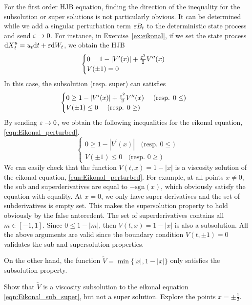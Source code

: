 \documentclass[11pt]{book}
\newcommand{\dt}{\text{\normalfont d}t}
\newcommand{\dX}{\text{\normalfont d}X}
\newcommand{\dW}{\text{\normalfont d}W}
\begin{document}
For the first order HJB equation, finding the direction of the inequality for the subsolution or super solutions is not particularly obvious. It can be determined while we add a singular perturbation term $\varepsilon B_t$ to the deterministic state process and send $\varepsilon\to0$. For instance, in Exercise~\ref{ex:eikonal}, if we set the state process ${\dX}_t^u=u_t{\dt}+\eps \dW_t$, we obtain the HJB 
\begin{equation}\label{eqn:Eikonal_perturbed}
\begin{cases}
		0=1-|V^{\prime}(x)|+\frac{\varepsilon^2}{2}V^{\prime\prime}(x)\\
		V(\pm1)=0
\end{cases}
\end{equation}
In this case, the subsolution (resp. super) can satisfies
\begin{equation}
\begin{cases}
		0\ge1-|V^{\prime}(x)|+\frac{\varepsilon^2}{2}V^{\prime\prime}(x)~~~~\textrm{(resp. $0\le$)}\\
		V(\pm1)\le0~~~~\textrm{(resp. $0\ge$)}
\end{cases}
\end{equation}
By sending $\varepsilon\to0$, we obtain the following inequalities for the eikonal equation, \eqref{eqn:Eikonal_perturbed}.
\begin{equation}\label{eqn:Eikonal_sub_super}
\begin{cases}
		0\ge1-|V^{\prime}(x)|~~~~\textrm{(resp. $0\le$)}\\
		V(\pm1)\le0~~~~\textrm{(resp. $0\ge$)}
\end{cases}
\end{equation}
We can easily check that the function $V(t,x)=1-|x|$ is a viscosity solution of the eikonal equation, \eqref{eqn:Eikonal_perturbed}. For example, at all points $x\neq0$, the sub and superderivatives are equal to $-\textrm{sgn}(x)$, which obviously satisfy the equation with equality. At $x=0$, we only have super derivatives and the set of subderivatives is empty set. This makes the supersolution property to hold obviously by the false antecedent. The set of superderivatives contains all $m\in[-1,1]$. Since $0\le1-|m|$, then $V(t,x)=1-|x|$ is also a subsolution. All the above arguments are valid since the boundary condition $V(t,\pm1)=0$ validates the sub and supersolution properties. 

On the other hand, the function $\tilde{V}=\min\{|x|,1-|x|\}$ only satisfies the subsolution property. 
\begin{ex}
Show that $\tilde{V}$ is a viscosity subsolution to the eikonal equation \eqref{eqn:Eikonal_sub_super}, but not a super solution. Explore the points $x=\pm\frac12$.
\end{ex}
\end{document}
